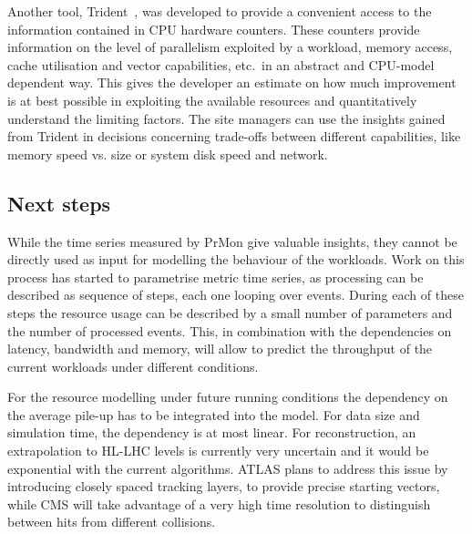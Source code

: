 Another tool, Trident~\cite{trident}, was developed to provide a
convenient access to the information contained in CPU hardware
counters.  These counters provide information on the level of
parallelism exploited by a workload, memory access, cache utilisation
and vector capabilities, etc.~in an abstract and CPU-model dependent
way.  This gives the developer an estimate on how much improvement is
at best possible in exploiting the available resources and
quantitatively understand the limiting factors. The site managers can
use the insights gained from Trident in decisions concerning
trade-offs between different capabilities, like memory speed vs. size
or system disk speed and network.

\subsection{Next steps}
While the time series measured by PrMon give valuable insights, they
cannot be directly used as input for modelling the behaviour of the
workloads. Work on this process has started to parametrise metric time
series, as processing can be described as sequence of steps, each one
looping over events. During each of these steps the resource usage can
be described by a small number of parameters and the number of
processed events. This, in combination with the dependencies on
latency, bandwidth and memory, will allow to predict the throughput of
the current workloads under different conditions.

For the resource modelling under future running conditions the
dependency on the average pile-up has to be integrated into the
model. For data size and simulation time, the dependency is at most
linear. For reconstruction, an extrapolation to HL-LHC levels is
currently very uncertain and it would be exponential with the current
algorithms. ATLAS plans to address this issue by introducing closely
spaced tracking layers, to provide precise starting vectors, while CMS
will take advantage of a very high time resolution to distinguish
between hits from different collisions.
